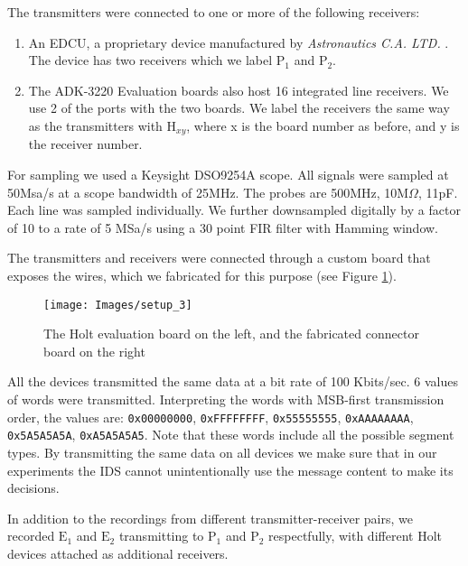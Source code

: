 \documentclass[compsoc,conference,a4paper]{IEEEtran}
\begin{document}
  The transmitters were connected to one or more of the following receivers:
  \begin{enumerate}
    \item An EDCU, a proprietary device manufactured by \textit{Astronautics C.A. LTD.} \cite{astronautics2019edcu}. The device has two receivers which we label \(\text{P}_1\) and \(\text{P}_2\).
    \item The ADK-3220 Evaluation boards also host 16 integrated line receivers. We use 2 of the ports with the two boards. We label the receivers the same way as the transmitters with \(\text{H}_{xy}\), where x is the board number as before, and y is the receiver number.
  \end{enumerate}
  
  For sampling we used a Keysight DSO9254A scope. All signals were sampled at 50Msa/s at a scope bandwidth of 25MHz. The probes are 500MHz, 10M\(\Omega\), 11pF. Each line was sampled individually. We further downsampled digitally by a factor of 10 to a rate of 5 MSa/s using a 30 point FIR filter with Hamming window.
  
  The transmitters and receivers were connected through a custom board that exposes the wires, which we fabricated for this purpose (see Figure \ref{fig:SetupImage}).
  
  \begin{figure}[t]
    \centering
    \texttt{[image: Images/setup\_3]}
    \caption{The Holt evaluation board on the left, and the fabricated connector board on the right}
    \label{fig:SetupImage}
  \end{figure}
  
  All the devices transmitted the same data at a bit rate of 100 Kbits/sec. 6 values of words were transmitted. Interpreting the words with MSB-first transmission order, the values are: \texttt{0x00000000}, \texttt{0xFFFFFFFF}, \texttt{0x55555555}, \texttt{0xAAAAAAAA}, \texttt{0x5A5A5A5A}, \texttt{0xA5A5A5A5}. Note that these words include all the possible segment types. By transmitting the same data on all devices we make sure that in our experiments the IDS cannot unintentionally use the message content to make its decisions.
  
  In addition to the recordings from different transmitter-receiver pairs, we recorded \(\text{E}_1\) and \(\text{E}_2\) transmitting to \(\text{P}_1\) and \(\text{P}_2\) respectfully, with different Holt devices attached as additional receivers.
  
\end{document}
